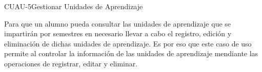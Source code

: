 \begin{UseCase}{CUAU-5}{Gestionar Unidades de Aprendizaje}
	{
		Para que un alumno pueda consultar las unidades de aprendizaje que se impartirán por semestres en necesario llevar a cabo el registro, edición y eliminación de dichas unidades de aprendizaje. Es por eso que este caso de uso permite al  controlar la información de las unidades de aprendizaje mendiante las operaciones de registrar, editar y eliminar.
			
		}
		
		
		

\end{UseCase}
